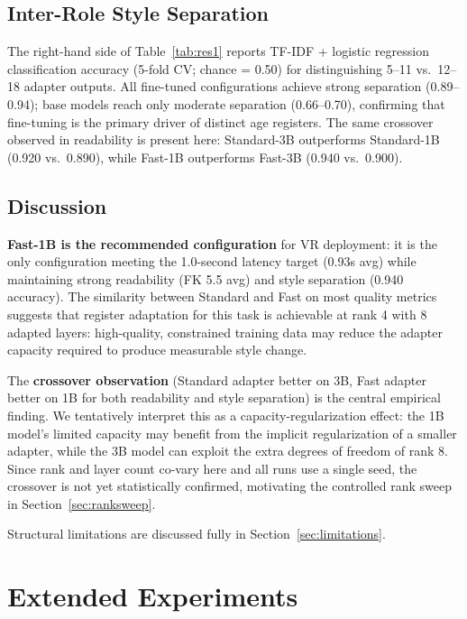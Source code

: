 \documentclass[ASNA,twocolumn]{USG} %
\begin{document}
\subsection{Inter-Role Style Separation}

The right-hand side of Table~\ref{tab:res1} reports TF-IDF + logistic regression classification accuracy (5-fold CV; chance = 0.50) for distinguishing 5--11 vs.\ 12--18 adapter outputs. All fine-tuned configurations achieve strong separation (0.89--0.94); base models reach only moderate separation (0.66--0.70), confirming that fine-tuning is the primary driver of distinct age registers. The same crossover observed in readability is present here: Standard-3B outperforms Standard-1B (0.920 vs.\ 0.890), while Fast-1B outperforms Fast-3B (0.940 vs.\ 0.900).


\subsection{Discussion}

\textbf{Fast-1B is the recommended configuration} for VR deployment: it is the only configuration meeting the 1.0-second latency target (0.93s avg) while maintaining strong readability (FK 5.5 avg) and style separation (0.940 accuracy). The similarity between Standard and Fast on most quality metrics suggests that register adaptation for this task is achievable at rank 4 with 8 adapted layers: high-quality, constrained training data may reduce the adapter capacity required to produce measurable style change.

The \textbf{crossover observation} (Standard adapter better on 3B, Fast adapter better on 1B for both readability and style separation) is the central empirical finding. We tentatively interpret this as a capacity-regularization effect: the 1B model's limited capacity may benefit from the implicit regularization of a smaller adapter, while the 3B model can exploit the extra degrees of freedom of rank 8. Since rank and layer count co-vary here and all runs use a single seed, the crossover is not yet statistically confirmed, motivating the controlled rank sweep in Section~\ref{sec:ranksweep}.

Structural limitations are discussed fully in Section~\ref{sec:limitations}.

\section{Extended Experiments}\label{sec:extended}
\end{document}
